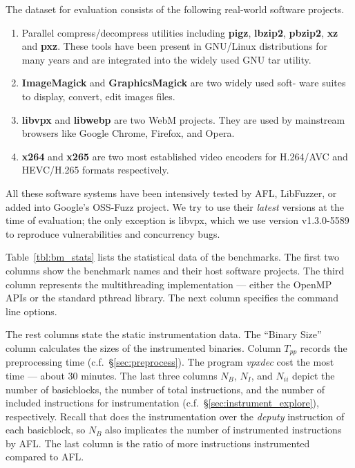 The dataset for evaluation consists of the following real-world software projects.
\begin{enumerate}[1)]
    \item Parallel compress/decompress utilities including \textbf{pigz}, \textbf{lbzip2}, 
			\textbf{pbzip2}, \textbf{xz} and \textbf{pxz}. These tools have been present in 
			GNU/Linux distributions for many years and are integrated
into the widely used GNU \textsf{tar} utility.
    \item \textbf{ImageMagick} and \textbf{GraphicsMagick} are two widely used soft-
ware suites to display, convert, edit images files.
    \item \textbf{libvpx} and \textbf{libwebp} are two WebM projects. They are used by
mainstream browsers like Google Chrome, Firefox, and Opera.
    \item \textbf{x264} and \textbf{x265} are two most established video encoders for
H.264/AVC and HEVC/H.265 formats respectively.
\end{enumerate}

All these software systems have been intensively tested by AFL, LibFuzzer, or added into Google's OSS-Fuzz project. We try to use their \emph{latest} versions at the 
time of evaluation; the only exception is libvpx, which we use version v1.3.0-5589 to 
reproduce vulnerabilities and concurrency bugs.


Table~\ref{tbl:bm_stats} lists the statistical data of the benchmarks. The first two 
columns show the benchmark names and their host software projects. The third column
represents the multithreading implementation --- either the OpenMP~\cite{openmp} 
APIs or the standard pthread library. The next column specifies the command line options.


The rest columns state the static instrumentation data. The ``Binary Size'' column 
calculates the sizes of the instrumented binaries. Column $T_{pp}$ records the 
preprocessing time (c.f.~\S\ref{sec:preprocess}). The program \emph{vpxdec} cost the 
most time --- about 30 minutes. The last three columns $N_B$, $N_I$, and $N_{ii}$ 
depict the number of basicblocks, the number of total instructions, and the number 
of included instructions for \mtfuzz instrumentation (c.f.~\S\ref{sec:instrument_explore}), 
respectively. Recall that \AFLIns does the instrumentation over the \emph{deputy} instruction 
of each basicblock, so $N_B$ also implicates the number of instrumented instructions by AFL. 
The last column is the ratio of more instructions \mtfuzz instrumented compared to AFL. 




